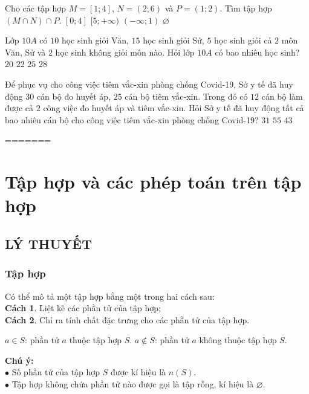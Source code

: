 \begin{ex}%
	Cho các tập hợp $M = [1; 4]$, $N = (2; 6)$ và $P = (1; 2)$. Tìm tập hợp $(M \cap N) \cap P$.
	\choice
	{$[0; 4]$}
	{$[5; + \infty  )$}
	{$(- \infty  ; 1)$}
	{\True $\varnothing $}
	\loigiai{
		Ta có $M\cap N=(2;4]\Rightarrow M\cap N\cap P=(2;4]\cap (1;2)=\varnothing$.
	}
\end{ex}
\begin{ex}%
	Lớp $10A$ có $10$ học sinh giỏi Văn, $15$ học sinh giỏi Sử, $5$ học sinh giỏi cả $2$ môn Văn, Sử và $2$ học sinh không giỏi môn nào. Hỏi lớp $10A$ có bao nhiêu học sinh?
	\choice
	{$20$ }
	{\True $22$}
	{$25$}
	{$28$}
\end{ex}
\begin{ex}%
	Để phục vụ cho công việc tiêm vắc-xin phòng chống Covid-19, Sở y tế đã huy động $30$ cán bộ đo huyết áp, $25$ cán bộ tiêm vắc-xin. Trong đó có $12$ cán bộ làm được cả $2$ công việc đo huyết áp và tiêm vắc-xin. Hỏi Sở y tế đã huy động tất cả bao nhiêu cán bộ cho công việc tiêm vắc-xin phòng chống Covid-19?
	{$31$}
	{$55$}
	{\True $43$}
\end{ex}

=======
\setcounter{section}{1}
\section{Tập hợp và các phép toán trên tập hợp}
\subsection{LÝ THUYẾT}
\subsubsection{Tập hợp}
\begin{tcolorbox}
	Có thể mô tả một tập hợp bằng một trong hai cách sau:\\
	\textbf{Cách 1}. Liệt kê các phần tử của tập hợp;\\
	\textbf{Cách 2}. Chỉ ra tính chất đặc trưng cho các phần tử của tập hợp.
\end{tcolorbox}
$a \in S$: phần tử $a$ thuộc tập hợp $S$.
$a \notin S$: phần tử $a$ không thuộc tập hợp $S$.
\begin{note}
	\textbf{Chú ý:}\\
	$\bullet$ Số phần tử của tập hợp $S$ được kí hiệu là $n(S)$.\\
	$\bullet$ Tập hợp không chứa phần tử nào được gọi là tập rỗng, kí hiệu là $\varnothing$.
\end{note}
